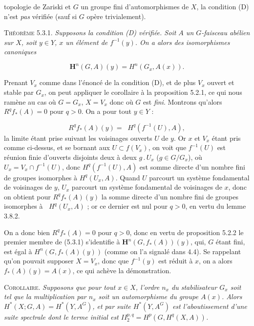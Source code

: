 \clearpage
{}

\noindent topologie de Zariski et $G$ un groupe fini d'automorphismes de $X$,
la condition (D) n'est \textit{pas} vérifiée (sauf si $G$ opère trivialement).

\textsc{Théorème 5.3.1.} \textit{Supposons la condition (D) vérifiée.
Soit $A$ un $G$-faisceau abélien sur $X$, soit $y\in Y$, $x$ un élément de
$f^{-1}(y)$. On a alors des isomorphismes canoniques}

\[
\mathbf H^n(G,A)(y)=H^n(G_x,A(x)).
\tag{5.3.1}
\]

Prenant $V_x$ comme dans l'énoncé de la condition (D), et de plus $V_x$
ouvert et stable par $G_x$, on peut appliquer le corollaire à la proposition
5.2.1, ce qui nous ramène au cas où $G=G_x$, $X=V_x$ donc où $G$ est
\textit{fini}. Montrons qu'alors $R^qf_*(A)=0$ pour $q>0$. On a pour tout
$y\in Y$ :

\[
R^qf_*(A)(y)=\mathop{\underset{\to}{\mathrm{lim.}}} H^q(f^{-1}(U),A),
\]
la limite étant prise suivant les voisinages ouverts $U$ de $y$. Or $x$ et
$V_x$ étant pris comme ci-dessus, et se bornant aux $U\subset f(V_x)$, on
voit que $f^{-1}(U)$ est réunion finie d'ouverts disjoints deux à deux
$g\mathbin{.}U_x$ ($g\in G/G_x$), où $U_x=V_x\cap f^{-1}(U)$, donc
$H^q(f^{-1}(U),A)$ est somme directe d'un nombre fini de groupes isomorphes à
$H^q(U_x,A)$. Quand $U$ parcourt un système fondamental de voisinages de $y$,
$U_x$ parcourt un système fondamental de voisinages de $x$, donc on obtient
pour $R^qf_*(A)(y)$ la somme directe d'un nombre fini de groupes isomorphes à
$\mathop{\underset{\to}{\lim}} H^q(U_x,A)$ ; or ce dernier est nul pour $q>0$, en vertu du lemme
3.8.2.

On a donc bien $R^qf_*(A)=0$ pour $q>0$, donc en vertu de proposition 5.2.2 le
premier membre de (5.3.1) s'identifie à $\mathbf H^n(G,f_*(A))(y)$, qui, $G$
étant fini, est égal à $H^n(G,f_*(A)(y))$ (comme on l'a signalé dans 4.4). Se
rappelant qu'on pouvait supposer $X=V_x$, donc que $f^{-1}(y)$ est réduit à
$x$, on a alors $f_*(A)(y)=A(x)$, ce qui achève la démonstration.

\textsc{Corollaire.} \textit{Supposons que pour tout $x\in X$,
l'ordre $n_x$ du stabilisateur $G_x$ soit tel que la multiplication par $n_x$
soit un automorphisme du groupe $A(x)$. Alors
$H^*(X;G,A)=H^*(Y,A^G)$, et par suite $H^*(Y,A^G)$ est l'aboutissement d'une
suite spectrale dont le terme initial est
$II_2^{p,q}=H^p(G,H^q(X,A))$.}

